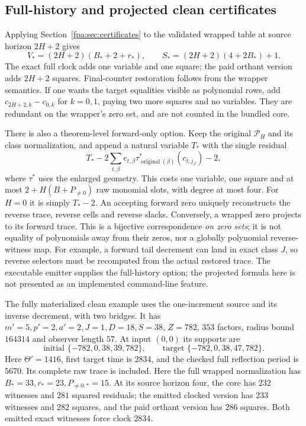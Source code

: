 \documentclass[11pt,a4paper]{article}
\numberwithin{equation}{section}
\begin{document}
\subsection{Full-history and projected clean certificates}
Applying Section~\ref{fpa:sec:certificates} to the validated wrapped table at
source horizon $2H+2$ gives
\[
 V_*=(2H+2)(B_*+2+r_*),\qquad
 S_*=(2H+2)(4+2B_*)+1.
\]
The exact full clock adds one variable and one square; the paid orthant version
adds $2H+2$ squares. Final-counter restoration follows from the wrapper
semantics. If one wants the target equalities visible as polynomial rows,
add $c_{2H+2,k}-c_{0,k}$ for $k=0,1$, paying two more squares and no variables.
They are redundant on the wrapper's zero set, and are not counted in the
bundled core.

There is also a theorem-level forward-only option. Keep the original
$\mathcal P_H$ and its class normalization, and append a natural variable
$T_*$ with the single residual
\[
 T_*-2\sum_{t,\beta}e_{t,\beta}
       \tau^*_{\operatorname{original}(\beta)}(c_{t,j_\beta})-2,
\]
where $\tau^*$ uses the enlarged geometry. This costs one variable, one
square and at most $2+H(B+P_{\ne0})$ raw monomial slots, with degree at most
four. For $H=0$ it is simply $T_*-2$. An accepting forward zero uniquely
reconstructs the reverse trace, reverse cells and reverse slacks. Conversely,
a wrapped zero projects to its forward trace. This is a bijective
correspondence \emph{on zero sets}; it is not equality of polynomials away
from their zeros, nor a globally polynomial reverse-witness map. For example,
a forward tail decrement can land in exact class $J$, so reverse selectors
must be recomputed from the actual restored trace. The executable emitter
supplies the full-history option; the projected formula here is not presented
as an implemented command-line feature.

The fully materialized clean example uses the one-increment source and its
inverse decrement, with two bridges. It has $m'=5,p'=2,a'=2,J=1,D=18,S=38$,
$Z=782$, $353$ factors, radius bound $164314$ and observer length $57$.
At input $(0,0)$ its supports are
\[
 \text{initial }\{-782,0,38,39,782\},\qquad
 \text{target }\{-782,0,38,47,782\}.
\]
Here $\Theta'=1416$, first target time is $2834$, and the checked full
reflection period is $5670$. Its complete raw trace is included.
Here the full wrapped normalization has $B_*=33,r_*=23,P_{\ne0,*}=15$.
At its source horizon four, the core has $232$ witnesses and $281$ squared
residuals; the emitted clocked version has $233$ witnesses and $282$ squares,
and the paid orthant version has $286$ squares. Both emitted exact witnesses
force clock $2834$.
\end{document}
